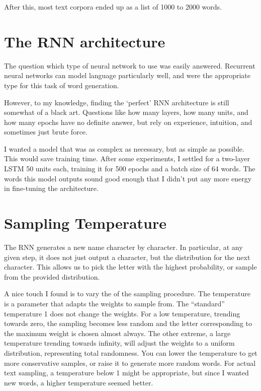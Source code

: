 \documentclass[letterpaper,10pt,english]{sphinxmanual}
\begin{document}
After this, most text corpora ended up as a list of 1000 to 2000 words.


\section{The RNN architecture}
\label{\detokenize{discussion:the-rnn-architecture}}
The question which type of neural network to use was easily answered. Recurrent neural networks can model language particularly well, and were the appropriate type for this task of word generation.

However, to my knowledge, finding the ‘perfect’ RNN architecture is still somewhat of a black art. Questions like how many layers, how many units, and how many epochs have no definite answer, but rely on experience, intuition, and sometimes just brute force.

I wanted a model that was as complex as necessary, but as simple as possible. This would save training time. After some experiments, I settled for a two-layer LSTM 50 units each, training it for 500 epochs and a batch size of 64 words. The words this model outputs sound good enough that I didn’t put any more energy in fine-tuning the architecture.


\section{Sampling Temperature}
\label{\detokenize{discussion:sampling-temperature}}
The RNN generates a new name character by character. In particular, at any given
step, it does not just output a character, but the distribution for the next
character. This allows us to pick the letter with the highest probability, or
sample from the provided distribution.

A nice touch I found is to vary the  of the sampling procedure. The
temperature is a parameter that adapts the weights to sample from. The
“standard” temperature 1 does not change the weights. For a low temperature,
trending towards zero, the sampling becomes less random and the letter
corresponding to the maximum weight is chosen almost always. The other extreme,
a large temperature trending towards infinity, will adjust the weights to a
uniform distribution, representing total randomness. You can lower the
temperature to get more conservative samples, or raise it to generate more
random words. For actual text sampling, a temperature below 1 might be
appropriate, but since I wanted new words, a higher temperature seemed better.
\end{document}

